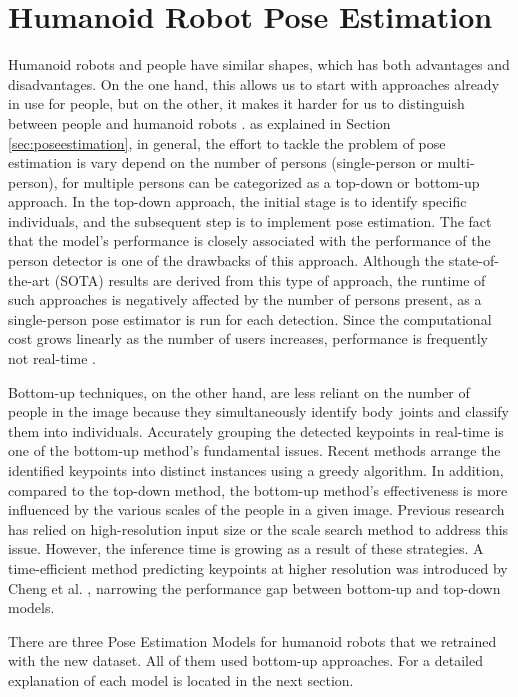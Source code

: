 \section{Humanoid Robot Pose Estimation}
\label{sec:humanoidrobotposeestimation}

Humanoid robots and people have similar shapes, which has both advantages and disadvantages. On the one hand, this allows us to start with approaches already in use for people, but on the other, it makes it harder for us to distinguish between people and humanoid robots \parencite{amini2021}.
as explained in Section \ref{sec:poseestimation}, in general, the effort to tackle the problem of pose estimation is vary depend on the number of persons (single-person or multi-person), for multiple persons can be categorized as a top-down or bottom-up approach.
In the top-down approach, the initial stage is to identify specific individuals, and the subsequent step is to implement pose estimation. The fact that the model's performance is closely associated with the performance of the person detector is one of the drawbacks of this approach. Although the state-of-the-art (SOTA) results are derived from this type of approach,  the runtime of such approaches is negatively affected by the number of persons present,
as a single-person pose estimator is run for each detection. Since the computational cost grows linearly as the number of users increases, performance is frequently not real-time \parencite{amini2021}.

Bottom-up techniques, on the other hand, are less reliant on the number of people in the image because they simultaneously identify body joints and classify them into individuals. Accurately grouping the detected keypoints in real-time is one of the bottom-up method's fundamental issues.
Recent methods arrange the identified keypoints into distinct instances using a greedy algorithm. In addition, compared to the top-down method, the bottom-up method's effectiveness is more influenced by the various scales of the people in a given image. Previous research has relied on high-resolution input size \parencite{papandreou2018} or the scale search method \parencite{cao2019} to address this issue. However, the inference time is growing as a result of these strategies.
A time-efficient method predicting keypoints at higher resolution was introduced by Cheng et al. \parencite{cheng2020}, narrowing the performance gap between bottom-up and top-down models.

There are three Pose Estimation Models for humanoid robots that we retrained with the
new dataset. All of them used bottom-up approaches. For a detailed explanation of each model is located in the next section.

